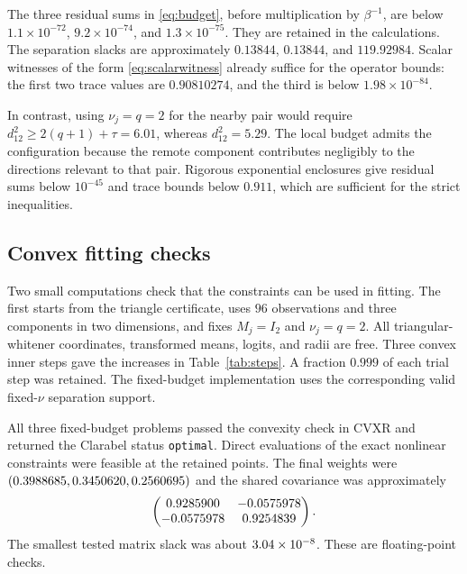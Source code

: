 \documentclass[12pt,a4paper]{article}
\theoremstyle{remark}
\begin{document}
The three residual sums in \eqref{eq:budget}, before multiplication by $\beta^{-1}$, are below $1.1\times10^{-72}$, $9.2\times10^{-74}$, and $1.3\times10^{-75}$. They are retained in the calculations. The separation slacks are approximately $0.13844$, $0.13844$, and $119.92984$. Scalar witnesses of the form \eqref{eq:scalarwitness} already suffice for the operator bounds: the first two trace values are $0.90810274$, and the third is below $1.98\times10^{-84}$.

In contrast, using $\nu_j=q=2$ for the nearby pair would require $d_{12}^2\ge2(q+1)+\tau=6.01$, whereas $d_{12}^2=5.29$. The local budget admits the configuration because the remote component contributes negligibly to the directions relevant to that pair. Rigorous exponential enclosures give residual sums below $10^{-45}$ and trace bounds below $0.911$, which are sufficient for the strict inequalities.

\subsection{Convex fitting checks}

Two small computations check that the constraints can be used in fitting. The first starts from the triangle certificate, uses $96$ observations and three components in two dimensions, and fixes $M_j=I_2$ and $\nu_j=q=2$. All triangular-whitener coordinates, transformed means, logits, and radii are free. Three convex inner steps gave the increases in Table~\ref{tab:steps}. A fraction $0.999$ of each trial step was retained. The fixed-budget implementation uses the corresponding valid fixed-$\nu$ separation support.

\begin{table}[htbp]
\centering
\doublespacing
\caption{Per-observation gains in the log likelihood and EM auxiliary function for the fitting checks. The proximal penalty uses the same scale.}
\label{tab:steps}

\end{table}

All three fixed-budget problems passed the convexity check in CVXR and returned the Clarabel status \texttt{optimal}. Direct evaluations of the exact nonlinear constraints were feasible at the retained points. The final weights were $(0.3988685,0.3450620,0.2560695)$ and the shared covariance was approximately
\[
 \begin{pmatrix}0.9285900&-0.0575978\\-0.0575978&0.9254839\end{pmatrix}.
\]
The smallest tested matrix slack was about $3.04\times 10^{-8}$. These are floating-point checks.
\end{document}

